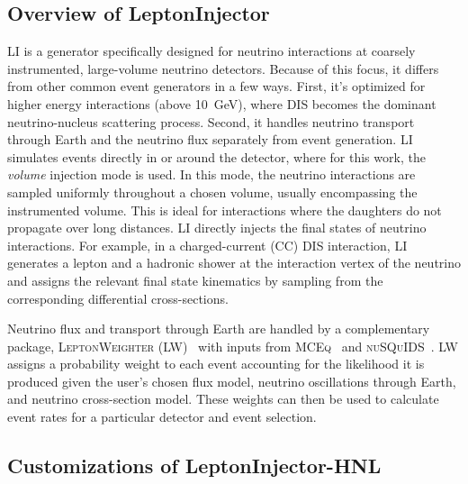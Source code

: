 \documentclass[
    aps,
    prd,
    reprint,
    amsmath,
    amssymb,
    nofootinbib,
    superscriptaddress,
    floatfix
]{revtex4-2}
\newcommand{\gev}{\giga\electronvolt}
\begin{document}
\subsection{Overview of LeptonInjector}

LI is a generator specifically designed for neutrino interactions at coarsely instrumented, large-volume neutrino detectors.
Because of this focus, it differs from other common event generators in a few ways.
First, it's optimized for higher energy interactions (above \SI{10}{\gev}), where DIS becomes the dominant neutrino-nucleus scattering process.
Second, it handles neutrino transport through Earth and the neutrino flux separately from event generation.
LI simulates events directly in or around the detector, where for this work, the \textit{volume} injection mode is used.
In this mode, the neutrino interactions are sampled uniformly throughout a chosen volume, usually encompassing the instrumented volume.
This is ideal for interactions where the daughters do not propagate over long distances.
LI directly injects the final states of neutrino interactions. For example, in a charged-current (CC) DIS interaction, LI generates a lepton and a hadronic shower at the interaction vertex of the neutrino and assigns the relevant final state kinematics by sampling from the corresponding differential cross-sections.

Neutrino flux and transport through Earth are handled by a complementary package, \textsc{LeptonWeighter} (LW)~\cite{IceCube:2020tcq} with inputs from \textsc{MCEq}~\cite{Fedynitch:2018cbl} and \textsc{nuSQuIDS}~\cite{Arguelles:2021twb}.
LW assigns a probability weight to each event accounting for the likelihood it is produced given the user's chosen flux model, neutrino oscillations through Earth, and neutrino cross-section model.
These weights can then be used to calculate event rates for a particular detector and event selection.


\subsection{Customizations of LeptonInjector-HNL}
\end{document}
